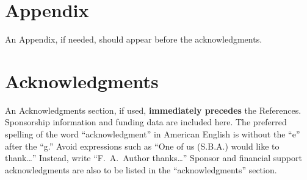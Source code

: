 \documentclass[conf]{new-aiaa}
\begin{document}
\section*{Appendix}

An Appendix, if needed, should appear before the acknowledgments.

\section*{Acknowledgments}
An Acknowledgments section, if used, \textbf{immediately precedes} the References. Sponsorship information and funding data are included here. The preferred spelling of the word ``acknowledgment'' in American English is without the ``e'' after the ``g.'' Avoid expressions such as ``One of us (S.B.A.) would like to thank\ldots'' Instead, write ``F.~A.~Author thanks\ldots'' Sponsor and financial support acknowledgments are also to be listed in the ``acknowledgments'' section.


\end{document}
